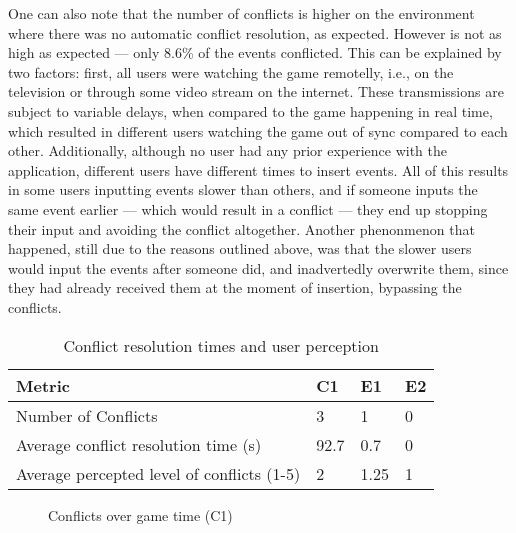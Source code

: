 One can also note that the number of conflicts is higher on the environment where there was no automatic conflict resolution, as expected. However is not as high as expected --- only 8.6\% of the events conflicted. This can be explained by two factors: first, all users were watching the game remotelly, i.e., on the television or through some video stream on the internet. These transmissions are subject to variable delays, when compared to the game happening in real time, which resulted in different users watching the game out of sync compared to each other. Additionally, although no user had any prior experience with the application, different users have different times to insert events. All of this results in some users inputting events slower than others, and if someone inputs the same event earlier --- which would result in a conflict --- they end up stopping their input and avoiding the conflict altogether. Another phenonmenon that happened, still due to the reasons outlined above, was that the slower users would input the events after someone did, and inadvertedly overwrite them, since they had already received them at the moment of insertion, bypassing the conflicts.

\begin{table}[h]
    \centering
    \caption{Conflict resolution times and user perception}
    \begin{tabular}{|l|l|l|l|}
        \hline
        \textbf{Metric}                        & \textbf{C1} & \textbf{E1} & \textbf{E2} \\ \hline
        Number of Conflicts                    & 3  & 1  & 0  \\ \hline
        Average conflict resolution time (s)   & 92.7  & 0.7  & 0  \\ \hline
        Average percepted level of conflicts (1-5)     & 2  & 1.25  & 1  \\ \hline
    \end{tabular}
    \label{table:num-conflicts-time-perception}
\end{table}

\begin{figure}[h]
    \centering
    \caption{Conflicts over game time (C1)}
    \label{chart:conflicts-over-time}
\end{figure}

